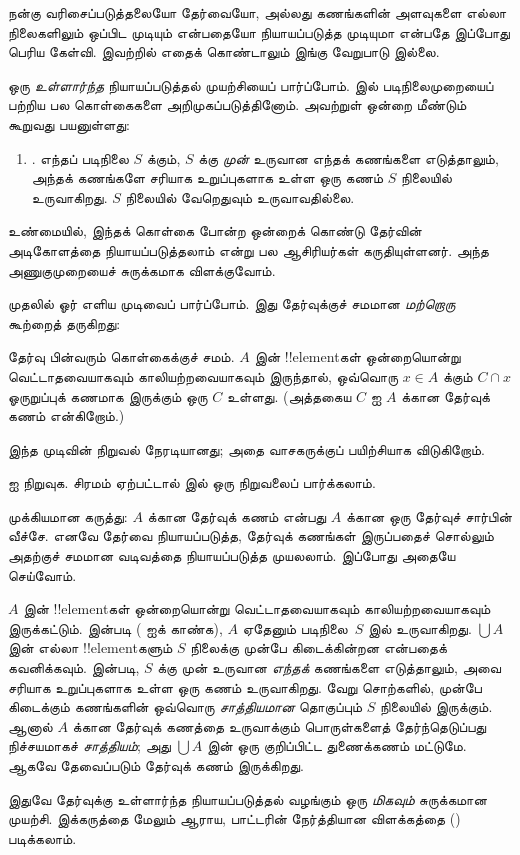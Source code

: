 \documentclass[../../../include/open-logic-section]{subfiles}
\begin{document}

நன்கு வரிசைப்படுத்தலையோ தேர்வையோ, அல்லது கணங்களின்
அளவுகளை எல்லா நிலைகளிலும் ஒப்பிட முடியும் என்பதையோ
நியாயப்படுத்த முடியுமா என்பதே இப்போது பெரிய கேள்வி.
இவற்றில் எதைக் கொண்டாலும் இங்கு வேறுபாடு இல்லை.

ஒரு \emph{உள்ளார்ந்த} நியாயப்படுத்தல் முயற்சியைப்
பார்ப்போம்.  இல் படிநிலைமுறையைப்
பற்றிய பல கொள்கைகளை அறிமுகப்படுத்தினோம். அவற்றுள்
ஒன்றை மீண்டும் கூறுவது பயனுள்ளது:
\begin{enumerate}
	\item[] \stagesacc. எந்தப் படிநிலை $S$ க்கும்,
	$S$ க்கு \emph{முன்} உருவான எந்தக் கணங்களை எடுத்தாலும்,
	அந்தக் கணங்களே சரியாக உறுப்புகளாக உள்ள ஒரு கணம்
	$S$ நிலையில் உருவாகிறது. $S$ நிலையில் வேறெதுவும்
	உருவாவதில்லை.
\end{enumerate}
உண்மையில், இந்தக் கொள்கை போன்ற ஒன்றைக் கொண்டு
தேர்வின் அடிகோளத்தை நியாயப்படுத்தலாம் என்று பல ஆசிரியர்கள்
கருதியுள்ளனர். அந்த அணுகுமுறையைச் சுருக்கமாக விளக்குவோம்.

முதலில் ஓர் எளிய முடிவைப் பார்ப்போம். இது தேர்வுக்குச்
சமமான \emph{மற்றொரு} கூற்றைத் தருகிறது:

\begin{thm}[$\ZF$ இல்]
தேர்வு பின்வரும் கொள்கைக்குச் சமம். $A$ இன் !!{element}கள்
ஒன்றையொன்று வெட்டாதவையாகவும் காலியற்றவையாகவும் இருந்தால்,
ஒவ்வொரு $x \in A$ க்கும் $C \cap x$ ஓருறுப்புக் கணமாக
இருக்கும் ஒரு $C$ உள்ளது. (அத்தகைய $C$ ஐ $A$ க்கான
{தேர்வுக் கணம்} என்கிறோம்.)
\end{thm}

இந்த முடிவின் நிறுவல் நேரடியானது; அதை வாசகருக்குப்
பயிற்சியாக விடுகிறோம்.

\begin{prob}
 ஐ நிறுவுக.
சிரமம் ஏற்பட்டால் \cite[pp.~242--3]{Potter2004} இல்
ஒரு நிறுவலைப் பார்க்கலாம்.
\end{prob}

முக்கியமான கருத்து: $A$ க்கான தேர்வுக் கணம் என்பது
$A$ க்கான ஒரு தேர்வுச் சார்பின் வீச்சே. எனவே தேர்வை
நியாயப்படுத்த, தேர்வுக் கணங்கள் இருப்பதைச் சொல்லும்
அதற்குச் சமமான வடிவத்தை நியாயப்படுத்த முயலலாம்.
இப்போது அதையே செய்வோம்.

$A$ இன் !!{element}கள் ஒன்றையொன்று வெட்டாதவையாகவும்
காலியற்றவையாகவும் இருக்கட்டும். \stageshier{} இன்படி
( ஐக் காண்க), $A$ ஏதேனும்
படிநிலை~$S$ இல் உருவாகிறது. $\bigcup A$ இன் எல்லா
!!{element}களும் $S$ நிலைக்கு முன்பே கிடைக்கின்றன
என்பதைக் கவனிக்கவும். \stagesacc{} இன்படி, $S$ க்கு
முன் உருவான \emph{எந்தக்} கணங்களை எடுத்தாலும்,
அவை சரியாக உறுப்புகளாக உள்ள ஒரு கணம் உருவாகிறது.
வேறு சொற்களில், முன்பே கிடைக்கும் கணங்களின் ஒவ்வொரு
\emph{சாத்தியமான} தொகுப்பும் $S$ நிலையில் இருக்கும்.
ஆனால் $A$ க்கான தேர்வுக் கணத்தை உருவாக்கும் பொருள்களைத்
தேர்ந்தெடுப்பது நிச்சயமாகச் \emph{சாத்தியம்}; அது
$\bigcup A$ இன் ஒரு குறிப்பிட்ட துணைக்கணம் மட்டுமே.
ஆகவே தேவைப்படும் தேர்வுக் கணம் இருக்கிறது.

இதுவே தேர்வுக்கு உள்ளார்ந்த நியாயப்படுத்தல் வழங்கும்
ஒரு \emph{மிகவும்} சுருக்கமான முயற்சி. இக்கருத்தை மேலும்
ஆராய, பாட்டரின் நேர்த்தியான விளக்கத்தை
(\citeyear[\S14.8]{Potter2004}) படிக்கலாம்.
\end{document}
